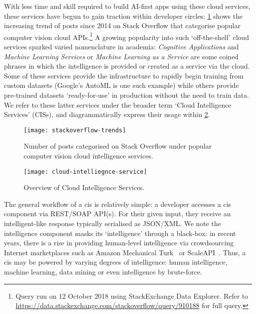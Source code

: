 With less time and skill required to build \gls{AI}-first apps using these cloud services,  these services have begun to gain traction within developer circles: \cref{fig:introduction:stackoverflow-trends} shows the increasing trend of posts since 2014 on Stack Overflow that categorise popular computer vision cloud APIs.\footnote{Query run on 12 October 2018 using StackExchange Data Explorer. Refer to \url{https://data.stackexchange.com/stackoverflow/query/910188} for full query.} A growing popularity into such `off-the-shelf' cloud services sparked varied nomenclature in academia: \textit{Cognitive Applications} and \textit{Machine Learning Services} \citep{Hwang:2017tr} or \textit{Machine Learning as a Service} \citep{Ribeiro:2015dz} are some coined phrases in which the intelligence is provided or created as a service via the cloud. Some of these services provide the infrastructure to rapidly begin training from custom datasets (Google's AutoML is one such example) while others provide pre-trained datasets `ready-for-use' in production without the need to train data. We refer to these latter services under the broader term `Cloud Intelligence Services' (\glspl{CIS}), and diagrammatically express their usage within \cref{fig:introduction:cloud-intelliegnce-service}.

\begin{figure}[t]
\centering
\caption[Increasing interest in the developer community of computer vision APIs]{Number of posts categorised on Stack Overflow under popular computer vision cloud intelligence services.}
\label{fig:introduction:stackoverflow-trends}
\texttt{[image: stackoverflow-trends]}
\end{figure}

\begin{figure}[th]
\centering
\caption[Overview of cloud intelligence services]{Overview of Cloud Intelligence Services.}
\label{fig:introduction:cloud-intelliegnce-service}
\texttt{[image: cloud-intelliegnce-service]}
\end{figure}

 
The general workflow of a \gls{cis} is relatively simple: a developer accesses a \gls{cis} component via REST/SOAP API(s). For their given input, they receive an intelligent-like response typically serialised as JSON/XML. We note the intelligence component masks its `intelligence' through a black-box: in recent years, there is a rise in providing human-level intelligence via crowdsourcing Internet marketplaces such as Amazon Mechanical Turk~\citep{MTurk:Home} or ScaleAPI~\citep{ScaleAPI:Home}. Thus, a \gls{cis} may be powered by varying degrees of intelligence: human intelligence, machine learning, data mining or even intelligence by brute-force.

